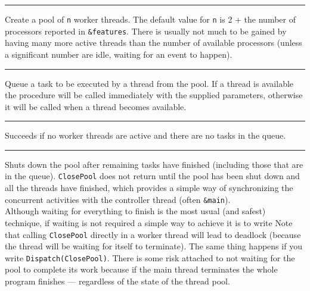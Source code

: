 \bigskip\hrule\vspace{0.1cm}
\noindent{}
Create a pool of \texttt{n} worker threads. The default value for \texttt{n} is
2 + the number of processors reported in \texttt{\&features}. There is usually
not much to be gained by having many more active threads than the number of
available processors (unless a significant number are idle, waiting for an event
to happen).

\bigskip\hrule\vspace{0.1cm}
\noindent{}
Queue a task to be executed by a thread from the pool. If a thread is available
the procedure will be called immediately with the supplied parameters, otherwise
it will be called when a thread becomes available.\\

\bigskip\hrule\vspace{0.1cm}
\noindent{}
Succeeds if no worker threads are active and there are no tasks in the queue.\\

\bigskip\hrule\vspace{0.1cm}
\noindent{}
Shuts down the pool after remaining tasks have finished
(including those that are in the queue). \texttt{ClosePool} does not return
until the pool has been shut down and all the threads have finished, which
provides a simple way of synchronizing the concurrent activities with the
controller thread (often \texttt{\&main}).\\

Although waiting for everything to finish is the most usual (and safest)
technique, if waiting is not required a simple way to achieve it is to write
{\small
{}
}
Note that calling \texttt{ClosePool} directly in a worker thread will lead to
deadlock (because the thread will be waiting for itself to terminate).  The same
thing happens if you write \texttt{Dispatch(ClosePool)}.  There is some risk
attached to not waiting for the pool to complete its work because if the main
thread terminates the whole program finishes --- regardless of the state of the
thread pool.

